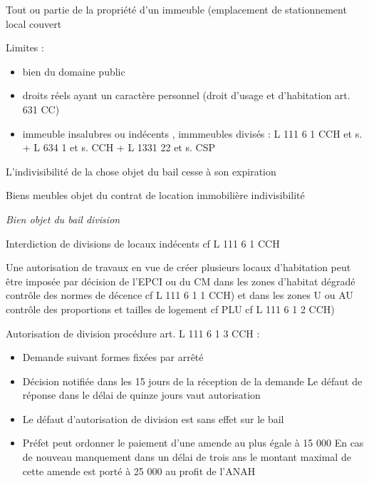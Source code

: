 \documentclass[10pt,a4paper,twoside]{article}
\newenvironment*{focus}[1][]{\medskip \textbf{#1} \newline \itshape}{}
\begin{document}
					Tout ou partie de la propriété d’un immeuble (emplacement de stationnement local couvert

					Limites :
					\begin{itemize}
						\item bien du domaine public

						\item droits réels ayant un caractère personnel (droit d’usage
						et d’habitation art. 631 CC)

						\item immeuble insalubres ou indécents , immmeubles divisés
						: L 111 6 1 CCH et s. + L 634 1 et s. CCH + L 1331 22
						et s. CSP
					\end{itemize}

					L’indivisibilité de la chose objet du bail cesse à son
					expiration

					Biens meubles objet du contrat de location
					immobilière indivisibilité

					\begin{focus}{Bien objet du bail division}

						Interdiction de divisions de locaux indécents cf L 111 6 1
						CCH

						Une autorisation de travaux en vue de créer plusieurs
						locaux d’habitation peut être imposée par décision de l’EPCI
						ou du CM dans les zones d’habitat dégradé contrôle des
						normes de décence cf L 111 6 1 1 CCH) et dans les zones
						U ou AU contrôle des proportions et tailles de logement cf
						PLU cf L 111 6 1 2 CCH)

						Autorisation de division procédure art. L 111 6 1 3 CCH :
						\begin{itemize}
							\item Demande suivant formes fixées par arrêté

							\item Décision notifiée dans les 15 jours de la réception de la
							demande Le défaut de réponse dans le délai de quinze jours
							vaut autorisation

							\item Le défaut d'autorisation de division est sans effet sur le bail

							\item Préfet peut ordonner le paiement d'une amende au plus
							égale à 15 000 En cas de nouveau manquement dans un
							délai de trois ans le montant maximal de cette amende est
							porté à 25 000 au profit de l’ANAH
						\end{itemize}
					\end{focus}
\end{document}
